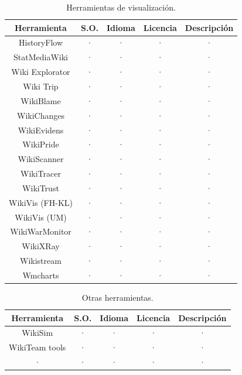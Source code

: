 \documentclass[11pt,onecolumn]{article}
\begin{document}
\begin{table}
\centering
\begin{tabular}{| c | c | c | c | c |}
\hline
\textbf{Herramienta} & \textbf{S.O.} & \textbf{Idioma} & \textbf{Licencia} & \textbf{Descripción} \\
\hline
HistoryFlow & · & · & · & · \\ \hline 
StatMediaWiki & · & · & · & · \\ \hline 
Wiki Explorator & · & · & · & · \\ \hline 
Wiki Trip & · & · & · & · \\ \hline 
WikiBlame & · & · & · & · \\ \hline 
WikiChanges & · & · & · & · \\ \hline 
WikiEvidens & · & · & · & · \\ \hline 
WikiPride & · & · & · & · \\ \hline 
WikiScanner & · & · & · & · \\ \hline 
WikiTracer & · & · & · & · \\ \hline 
WikiTrust & · & · & · & · \\ \hline 
WikiVis (FH-KL) & · & · & · & · \\ \hline 
WikiVis (UM) & · & · & · & · \\ \hline 
WikiWarMonitor & · & · & · & · \\ \hline 
WikiXRay & · & · & · & · \\ \hline 
Wikistream & · & · & · & · \\ \hline 
Wmcharts & · & · & · & · \\ \hline 
\end{tabular}
\caption{Herramientas de visualización.}
\label{tab:visualizationtoolstable}
\end{table}


\begin{table}
\centering
\begin{tabular}{| c | c | c | c | c |}
\hline
\textbf{Herramienta} & \textbf{S.O.} & \textbf{Idioma} & \textbf{Licencia} & \textbf{Descripción} \\
\hline
WikiSim & · & · & · & · \\ \hline 
WikiTeam tools & · & · & · & · \\ \hline 
· & · & · & · & · \\ \hline 
\end{tabular}
\caption{Otras herramientas.}
\label{tab:othertoolstable}
\end{table}
\end{document}
